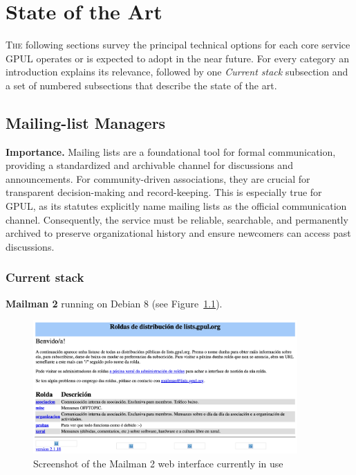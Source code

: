 %

\chapter{State of the Art}
\label{chap:state-of-the-art}

\lettrine{T}{he} following sections survey the principal technical options for each core service GPUL operates or is expected to adopt in the near future.  
For every category an introduction explains its relevance, followed by one \emph{Current stack} subsection and a set of numbered subsections that describe the state of the art.  

\section{Mailing-list Managers}

\textbf{Importance.} Mailing lists are a foundational tool for formal communication, providing a standardized and archivable channel for discussions and announcements. For community-driven associations, they are crucial for transparent decision-making and record-keeping. This is especially true for GPUL, as its statutes explicitly name mailing lists as the official communication channel. Consequently, the service must be reliable, searchable, and permanently archived to preserve organizational history and ensure newcomers can access past discussions.

\subsection*{Current stack}
\textbf{Mailman 2} running on Debian 8 (see Figure~\ref{fig:mailman2}).

\begin{figure}[H]
  \centering
  \includegraphics[width=0.9\textwidth]{imaxes/mailman-2-current.png}
  \caption{Screenshot of the Mailman 2 web interface currently in use}
  \label{fig:mailman2}
\end{figure}

